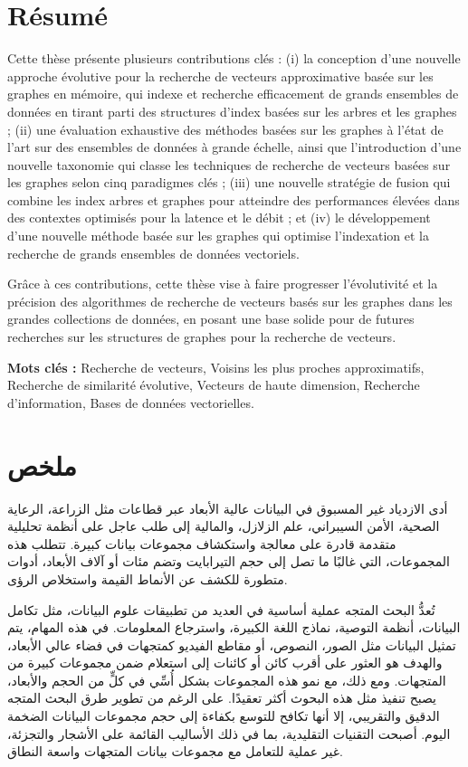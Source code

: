 \documentclass[12pt]{thesis}
\newenvironment{abstractfrench}{
    \selectlanguage{french}
    \chapter*{Résumé}
}{
}
\newenvironment{abstractarabic}{
    \selectlanguage{arabic}
    \chapter*{\textarabic{ملخص}}
}{
}
\begin{document}
\begin{preliminary}
\begin{abstractfrench}
Cette thèse présente plusieurs contributions clés : (i) la conception d'une nouvelle approche évolutive pour la recherche de vecteurs approximative basée sur les graphes en mémoire, qui indexe et recherche efficacement de grands ensembles de données en tirant parti des structures d'index basées sur les arbres et les graphes ; (ii) une évaluation exhaustive des méthodes basées sur les graphes à l'état de l'art sur des ensembles de données à grande échelle, ainsi que l'introduction d'une nouvelle taxonomie qui classe les techniques de recherche de vecteurs basées sur les graphes selon cinq paradigmes clés ; (iii) une nouvelle stratégie de fusion qui combine les index arbres et graphes pour atteindre des performances élevées dans des contextes optimisés pour la latence et le débit ; et (iv) le développement d'une nouvelle méthode basée sur les graphes qui optimise l'indexation et la recherche de grands ensembles de données vectoriels.

Grâce à ces contributions, cette thèse vise à faire progresser l'évolutivité et la précision des algorithmes de recherche de vecteurs basés sur les graphes dans les grandes collections de données, en posant une base solide pour de futures recherches sur les structures de graphes pour la recherche de vecteurs.

\textbf{Mots clés :} Recherche de vecteurs, Voisins les plus proches approximatifs, Recherche de similarité évolutive, Vecteurs de haute dimension, Recherche d'information, Bases de données vectorielles.
\end{abstractfrench}


\begin{abstractarabic}
أدى الازدياد غير المسبوق في البيانات عالية الأبعاد عبر قطاعات مثل الزراعة، الرعاية الصحية، الأمن السيبراني، علم الزلازل، والمالية إلى طلب عاجل على أنظمة تحليلية متقدمة قادرة على معالجة واستكشاف مجموعات بيانات كبيرة. تتطلب هذه المجموعات، التي غالبًا ما تصل إلى حجم التيرابايت وتضم مئات أو آلاف الأبعاد، أدوات متطورة للكشف عن الأنماط القيمة واستخلاص الرؤى.

تُعدُّ البحث المتجه عملية أساسية في العديد من تطبيقات علوم البيانات، مثل تكامل البيانات، أنظمة التوصية، نماذج اللغة الكبيرة، واسترجاع المعلومات. في هذه المهام، يتم تمثيل البيانات مثل الصور، النصوص، أو مقاطع الفيديو كمتجهات في فضاء عالي الأبعاد، والهدف هو العثور على أقرب كائن أو كائنات إلى استعلام ضمن مجموعات كبيرة من المتجهات. ومع ذلك، مع نمو هذه المجموعات بشكل أُسِّي في كلٍّ من الحجم والأبعاد، يصبح تنفيذ مثل هذه البحوث أكثر تعقيدًا. على الرغم من تطوير طرق البحث المتجه الدقيق والتقريبي، إلا أنها تكافح للتوسع بكفاءة إلى حجم مجموعات البيانات الضخمة اليوم. أصبحت التقنيات التقليدية، بما في ذلك الأساليب القائمة على الأشجار والتجزئة، غير عملية للتعامل مع مجموعات بيانات المتجهات واسعة النطاق.


\end{abstractarabic}
\end{preliminary}
\end{document}
